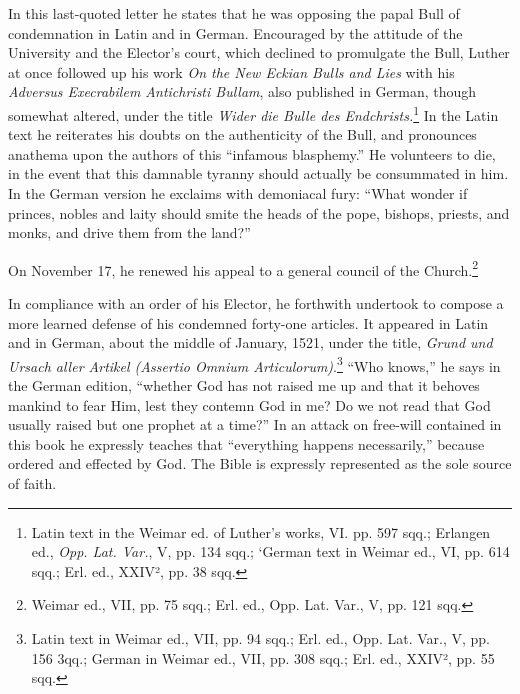 In this last-quoted letter he states that he was opposing the papal
Bull of condemnation in Latin and in German. Encouraged by the
attitude of the University and the Elector’s court, which declined to
promulgate the Bull, Luther at once followed up his work \textit{On the
New Eckian Bulls and Lies} with his \textit{Adversus Execrabilem Antichristi
Bullam}, also published in German, though somewhat altered,
under the title \textit{Wider die Bulle des Endchrists.}\footnote
{Latin text in the Weimar ed. of Luther’s works, VI. pp. 597 sqq.; Erlangen ed., \textit{Opp.
Lat. Var.}, V, pp. 134 sqq.; ‘German text in Weimar ed., VI, pp. 614 sqq.; Erl. ed., XXIV²,
pp. 38 sqq.}
In the Latin text he
reiterates his doubts on the authenticity of the Bull, and pronounces
anathema upon the authors of this “infamous blasphemy.” He volunteers
to die, in the event that this damnable tyranny should actually
be consummated in him. In the German version he exclaims with
demoniacal fury: “What wonder if princes, nobles and laity should
smite the heads of the pope, bishops, priests, and monks, and drive
them from the land?”

On November 17, he renewed his appeal to a general council of
the Church.\footnote{Weimar ed., VII, pp. 75 sqq.; Erl. ed., Opp. Lat. Var., V, pp. 121 sqq.}

In compliance with an order of his Elector, he forthwith undertook to compose
a more learned defense of his condemned forty-one
articles. It appeared in Latin and in German, about the middle of
January, 1521, under the title, \textit{Grund und Ursach aller Artikel (Assertio
Omnium Articulorum)}.\footnote
{Latin text in Weimar ed., VII, pp. 94 sqq.; Erl. ed., Opp. Lat. Var., V, pp. 156 3qq.;
German in Weimar ed., VII, pp. 308 sqq.; Erl. ed., XXIV², pp. 55 sqq.}
“Who knows,” he says in the German
edition, “whether God has not raised me up and that it behoves
mankind to fear Him, lest they contemn God in me? Do we not read
that God usually raised but one prophet at a time?” In an attack on
free-will contained in this book he expressly teaches that “everything
happens necessarily,” because ordered and effected by God. The
Bible is expressly represented as the sole source of faith.

